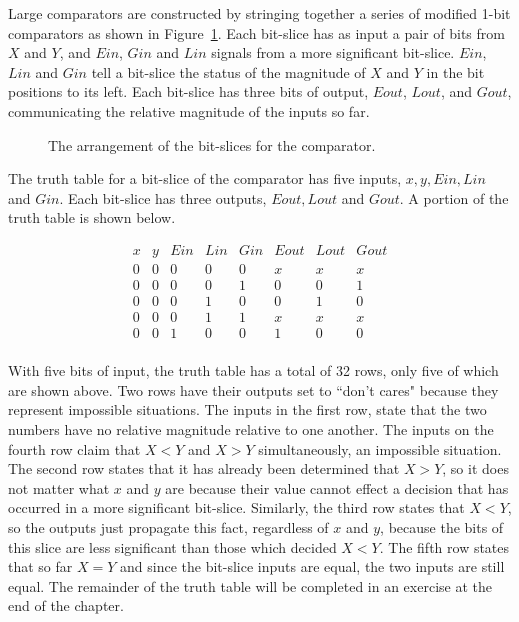 Large comparators are constructed by stringing together a series
of modified 1-bit comparators as shown in Figure~\ref{fig:comboBBCompare}.  
Each bit-slice has as input a pair 
of bits from $X$ and $Y$, and $Ein$, $Gin$ and $Lin$ signals from a
more significant bit-slice.  $Ein$, $Lin$ and $Gin$ tell a bit-slice the 
status of the magnitude of $X$ and $Y$ in the bit positions to
its left.  Each bit-slice has three bits of output, $Eout$, $Lout$, and 
$Gout$, communicating the relative magnitude of the inputs so far.

\begin{figure}[ht]
\caption{The arrangement of the bit-slices for the comparator.}
\label{fig:comboBBCompare}
\end{figure}

The truth table for a bit-slice of the comparator has five inputs, 
$x, y, Ein, Lin$ and $Gin$.  Each bit-slice has three outputs, 
$Eout, Lout$ and $Gout$.  A portion of the truth table is shown below.

$$\begin{array}{c|c|c|c|c||c|c|c}
x & y & Ein & Lin & Gin & Eout & Lout & Gout	\\ \hline
0 & 0 & 0   & 0   & 0 	& x    & x    & x	\\ \hline
0 & 0 & 0   & 0   & 1 	& 0    & 0    & 1	\\ \hline
0 & 0 & 0   & 1   & 0 	& 0    & 1    & 0	\\ \hline
0 & 0 & 0   & 1   & 1 	& x    & x    & x	\\ \hline
0 & 0 & 1   & 0   & 0 	& 1    & 0    & 0	\\
\end{array}$$

With five bits of input, the truth table has a total of 32 rows, only
five of which are shown above.  Two rows have their outputs set to 
``don't cares" because they represent impossible situations.  The inputs
in the first row, state that the two numbers have no relative 
magnitude relative to one another.  The inputs on the fourth row 
claim that $X<Y$ and $X>Y$ simultaneously, an impossible situation.
The second row states that it has already been determined that $X>Y$,
so it does not matter what $x$ and $y$ are because their value cannot 
effect a decision that has occurred
in a more significant bit-slice.  Similarly, the third row states
that $X<Y$, so the outputs just propagate this fact, regardless 
of $x$ and $y$, because the bits of this slice are less significant
than those which decided $X<Y$.  The fifth row states that
so far $X=Y$ and since the bit-slice inputs are equal, the 
two inputs are still equal.  The remainder of the truth table will
be completed in an exercise at the end of the chapter.

